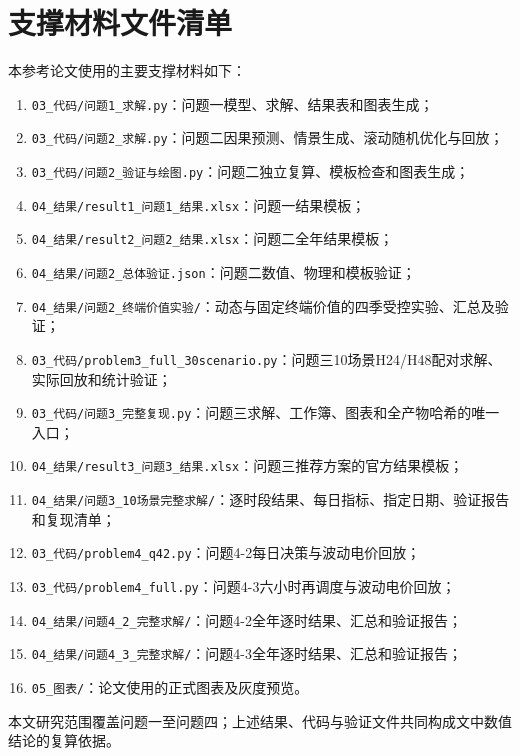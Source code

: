 \documentclass[UTF8,12pt,a4paper]{ctexart}
\begin{document}



\appendix
\section{支撑材料文件清单}

本参考论文使用的主要支撑材料如下：
\begin{enumerate}
  \item \texttt{03\_代码/问题1\_求解.py}：问题一模型、求解、结果表和图表生成；
  \item \texttt{03\_代码/问题2\_求解.py}：问题二因果预测、情景生成、滚动随机优化与回放；
  \item \texttt{03\_代码/问题2\_验证与绘图.py}：问题二独立复算、模板检查和图表生成；
  \item \texttt{04\_结果/result1\_问题1\_结果.xlsx}：问题一结果模板；
  \item \texttt{04\_结果/result2\_问题2\_结果.xlsx}：问题二全年结果模板；
  \item \texttt{04\_结果/问题2\_总体验证.json}：问题二数值、物理和模板验证；
  \item \texttt{04\_结果/问题2\_终端价值实验/}：动态与固定终端价值的四季受控实验、汇总及验证；
  \item \texttt{03\_代码/problem3\_full\_30scenario.py}：问题三10场景H24/H48配对求解、实际回放和统计验证；
  \item \texttt{03\_代码/问题3\_完整复现.py}：问题三求解、工作簿、图表和全产物哈希的唯一入口；
  \item \texttt{04\_结果/result3\_问题3\_结果.xlsx}：问题三推荐方案的官方结果模板；
  \item \texttt{04\_结果/问题3\_10场景完整求解/}：逐时段结果、每日指标、指定日期、验证报告和复现清单；
  \item \texttt{03\_代码/problem4\_q42.py}：问题4-2每日决策与波动电价回放；
  \item \texttt{03\_代码/problem4\_full.py}：问题4-3六小时再调度与波动电价回放；
  \item \texttt{04\_结果/问题4\_2\_完整求解/}：问题4-2全年逐时结果、汇总和验证报告；
  \item \texttt{04\_结果/问题4\_3\_完整求解/}：问题4-3全年逐时结果、汇总和验证报告；
  \item \texttt{05\_图表/}：论文使用的正式图表及灰度预览。
\end{enumerate}

本文研究范围覆盖问题一至问题四；上述结果、代码与验证文件共同构成文中数值结论的复算依据。
\end{document}
